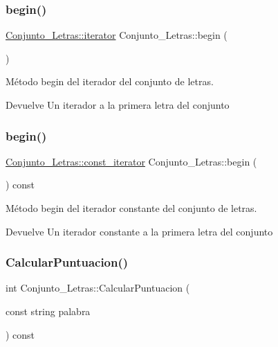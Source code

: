 \subsubsection{\texorpdfstring{begin()}{begin()}\hspace{0.1cm}{\footnotesize\ttfamily [1/2]}}
{\footnotesize\ttfamily \hyperlink{classConjunto__Letras_a2be8a16582f74bbe7561955083f02a52}{Conjunto\+\_\+\+Letras\+::iterator} Conjunto\+\_\+\+Letras\+::begin (\begin{DoxyParamCaption}{ }\end{DoxyParamCaption})}



Método begin del iterador del conjunto de letras. 

\begin{DoxyReturn}{Devuelve}
Un iterador a la primera letra del conjunto 
\end{DoxyReturn}
\mbox{\label{classConjunto__Letras_a05e3def044414513abc7d6048de5f9ce}} 
\subsubsection{\texorpdfstring{begin()}{begin()}\hspace{0.1cm}{\footnotesize\ttfamily [2/2]}}
{\footnotesize\ttfamily \hyperlink{classConjunto__Letras_a66b252ad22ca76b522ef68fc7e6d09b1}{Conjunto\+\_\+\+Letras\+::const\+\_\+iterator} Conjunto\+\_\+\+Letras\+::begin (\begin{DoxyParamCaption}{ }\end{DoxyParamCaption}) const}



Método begin del iterador constante del conjunto de letras. 

\begin{DoxyReturn}{Devuelve}
Un iterador constante a la primera letra del conjunto 
\end{DoxyReturn}
\mbox{\label{classConjunto__Letras_a2958b1e88656da47fb1d7e527dbb0853}} 
\subsubsection{\texorpdfstring{Calcular\+Puntuacion()}{CalcularPuntuacion()}}
{\footnotesize\ttfamily int Conjunto\+\_\+\+Letras\+::\+Calcular\+Puntuacion (\begin{DoxyParamCaption}\item[{const string}]{palabra }\end{DoxyParamCaption}) const}



